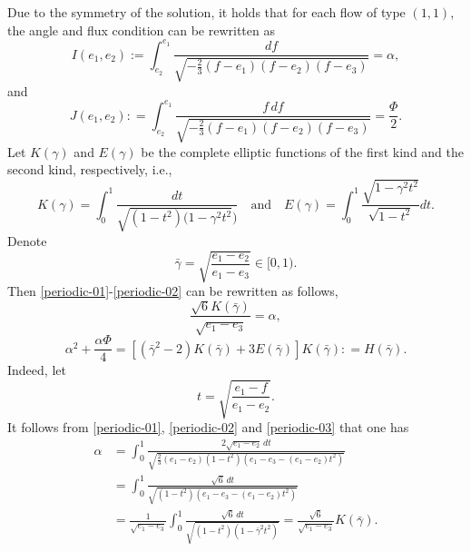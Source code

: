 \documentclass[reqno,12pt]{amsart}
\begin{document}

Due to the symmetry of the solution, it holds that for each flow of type $(1, 1)$,  the angle and flux condition can be rewritten as  
\begin{equation}\label{periodic-01}
I(e_1, e_2):=  \int_{e_2}^{e_1} \frac{df}{\sqrt{-\frac23 (f-e_1)(f-e_2) (f- e_3)}} = \alpha , 
\end{equation}
and 
\begin{equation}\label{periodic-02}
  J(e_1, e_2): =  \int_{e_2}^{e_1} \frac{f\, df}{\sqrt{-\frac23 (f-e_1) (f-e_2)(f-e_3)}} = \frac{\Phi}{2}. 
\end{equation}
Let $K( \gamma)$ and $E( \gamma)$ be the complete elliptic functions of the first kind and the second kind, respectively, i.e., 
\begin{equation}\label{defKE}
    K( \gamma) =\int_0^1 \frac{dt}{\sqrt{(1-t^2)(1- \gamma^2t^2})}\quad \text{and}\quad  E( \gamma) = \int_0^1 \frac{\sqrt{1-\gamma^2t^2}}{\sqrt{1-t^2}} dt.
\end{equation}
Denote
\begin{equation}\label{periodic-03}
 { \bar{\gamma}} = \sqrt{\frac{e_1 - e_2}{e_1 - e_3}}\in[0,1).
\end{equation} 
Then \eqref{periodic-01}-\eqref{periodic-02} can be rewritten as follows, 
\begin{equation}\label{periodic-1}
  \frac{ \sqrt{6} K( { \bar{\gamma}})}{\sqrt{e_1 - e_3}} =  \alpha,  
\end{equation}
\begin{equation}\label{periodic-3}
    \alpha^2 + \frac{\alpha \Phi}{4} =  [(\bar{\gamma}^2 -2)K( { \bar{\gamma}}) + 3E( \bar{ {\gamma}})]K( { \bar{\gamma}}) : = H( { \bar{\gamma}}). 
\end{equation}
Indeed, let 
\begin{equation*}t= \sqrt{\frac{e_1 -f}{e_1 - e_2}}.
\end{equation*}
It follows from \eqref{periodic-01}, \eqref{periodic-02} and \eqref{periodic-03} that one has
\begin{align*}
  \alpha 
  &= \int_{0}^{1} \frac{2\sqrt{e_1 - e_2} \, dt }{\sqrt{\frac23 (e_1-e_2) (1-t^2) (e_1- e_3- (e_1 - e_2)t^2)}}\\
  &= \int_0^1 \frac{\sqrt{6} \, dt }{\sqrt{(1-t^2) (e_1 - e_3 - (e_1 - e_2)t^2 )}}  \\
  &= \frac{1}{\sqrt{e_1 - e_3}}\int_0^1 \frac{\sqrt{6}\, dt}{\sqrt{(1-t^2) (1-  \bar{\gamma}^2 t^2)}}
  = \frac{\sqrt{6}}{\sqrt{e_1 -e_3}} K( \bar{\gamma}). 
\end{align*}
\end{document}
